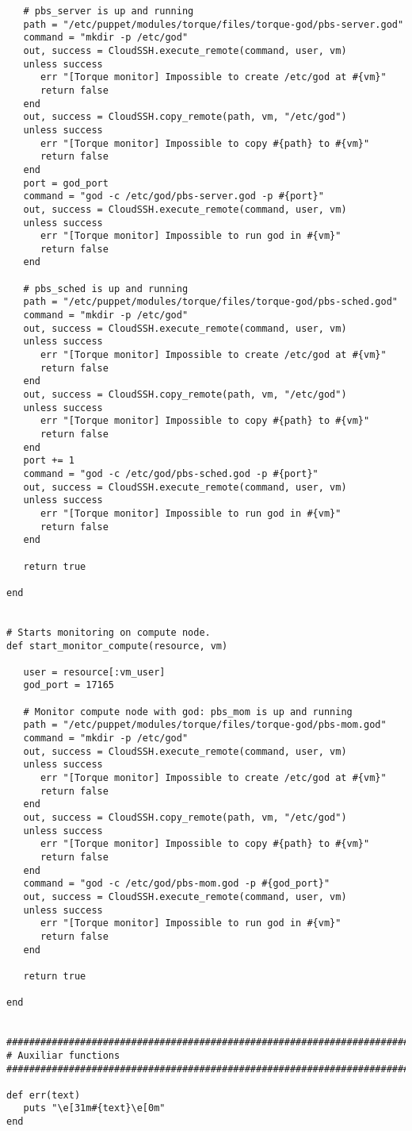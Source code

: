 \begin{lstlisting}
   # pbs_server is up and running
   path = "/etc/puppet/modules/torque/files/torque-god/pbs-server.god"
   command = "mkdir -p /etc/god"
   out, success = CloudSSH.execute_remote(command, user, vm)
   unless success
      err "[Torque monitor] Impossible to create /etc/god at #{vm}"
      return false
   end
   out, success = CloudSSH.copy_remote(path, vm, "/etc/god")
   unless success
      err "[Torque monitor] Impossible to copy #{path} to #{vm}"
      return false
   end
   port = god_port
   command = "god -c /etc/god/pbs-server.god -p #{port}"
   out, success = CloudSSH.execute_remote(command, user, vm)
   unless success
      err "[Torque monitor] Impossible to run god in #{vm}"
      return false
   end
   
   # pbs_sched is up and running
   path = "/etc/puppet/modules/torque/files/torque-god/pbs-sched.god"
   command = "mkdir -p /etc/god"
   out, success = CloudSSH.execute_remote(command, user, vm)
   unless success
      err "[Torque monitor] Impossible to create /etc/god at #{vm}"
      return false
   end
   out, success = CloudSSH.copy_remote(path, vm, "/etc/god")
   unless success
      err "[Torque monitor] Impossible to copy #{path} to #{vm}"
      return false
   end
   port += 1
   command = "god -c /etc/god/pbs-sched.god -p #{port}"
   out, success = CloudSSH.execute_remote(command, user, vm)
   unless success
      err "[Torque monitor] Impossible to run god in #{vm}"
      return false
   end
   
   return true

end


# Starts monitoring on compute node.
def start_monitor_compute(resource, vm)
   
   user = resource[:vm_user]
   god_port = 17165
   
   # Monitor compute node with god: pbs_mom is up and running
   path = "/etc/puppet/modules/torque/files/torque-god/pbs-mom.god"
   command = "mkdir -p /etc/god"
   out, success = CloudSSH.execute_remote(command, user, vm)
   unless success
      err "[Torque monitor] Impossible to create /etc/god at #{vm}"
      return false
   end
   out, success = CloudSSH.copy_remote(path, vm, "/etc/god")
   unless success
      err "[Torque monitor] Impossible to copy #{path} to #{vm}"
      return false
   end
   command = "god -c /etc/god/pbs-mom.god -p #{god_port}"
   out, success = CloudSSH.execute_remote(command, user, vm)
   unless success
      err "[Torque monitor] Impossible to run god in #{vm}"
      return false
   end
   
   return true

end


################################################################################
# Auxiliar functions
################################################################################

def err(text)
   puts "\e[31m#{text}\e[0m"
end

\end{lstlisting}


